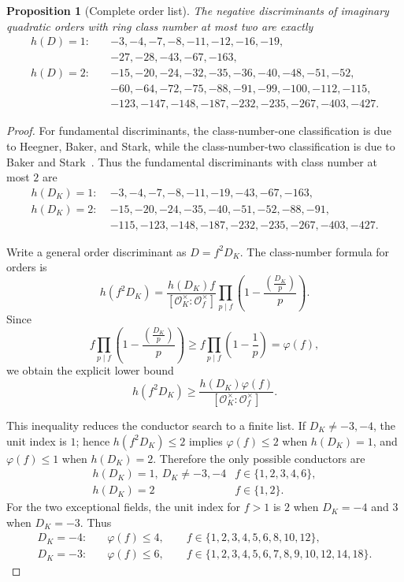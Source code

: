 \documentclass[11pt,a4paper]{amsart} %
\newtheorem{proposition}[theorem]{Proposition}
\theoremstyle{definition}
\begin{document}
\begin{proposition}[Complete order list]\label{prop:h2orders}
The negative discriminants of imaginary quadratic orders with ring class number
at most two are exactly
\[
\begin{aligned}
h(D)=1:\quad&
-3,-4,-7,-8,-11,-12,-16,-19,\\
&-27,-28,-43,-67,-163,\\
h(D)=2:\quad&
-15,-20,-24,-32,-35,-36,-40,-48,-51,-52,\\
&-60,-64,-72,-75,-88,-91,-99,-100,-112,-115,\\
&-123,-147,-148,-187,-232,-235,-267,-403,-427.
\end{aligned}
\]
\end{proposition}

\begin{proof}
For fundamental discriminants, the class-number-one classification is due to
Heegner, Baker, and Stark, while the class-number-two classification is due
to Baker and Stark~\cite{Stark1,Baker2,Stark2}. Thus the fundamental
discriminants with class number at most \(2\) are
\[
\begin{aligned}
h(D_K)=1:\;&
-3,-4,-7,-8,-11,-19,-43,-67,-163,\\
h(D_K)=2:\;&
-15,-20,-24,-35,-40,-51,-52,-88,-91,\\
&-115,-123,-148,-187,-232,-235,-267,-403,-427.
\end{aligned}
\]

Write a general order discriminant as \(D=f^2D_K\). The class-number formula
for orders is
\[
h(f^2D_K)=
\frac{h(D_K)f}{[\mathcal O_K^\times:\mathcal O_f^\times]}
\prod_{p\mid f}
\left(1-\frac{(\frac{D_K}{p})}{p}\right).
\tag{0}
\]
Since
\[
f\prod_{p\mid f}
\left(1-\frac{(\frac{D_K}{p})}{p}\right)
\ge
f\prod_{p\mid f}\left(1-\frac1p\right)
=\varphi(f),
\]
we obtain the explicit lower bound
\[
h(f^2D_K)\ge
\frac{h(D_K)\varphi(f)}
{[\mathcal O_K^\times:\mathcal O_f^\times]}.
\]

This inequality reduces the conductor search to a finite list. If
\(D_K\ne-3,-4\), the unit index is \(1\); hence \(h(f^2D_K)\le2\) implies
\(\varphi(f)\le2\) when \(h(D_K)=1\), and \(\varphi(f)\le1\) when
\(h(D_K)=2\). Therefore the only possible conductors are
\[
\begin{array}{c|c}
h(D_K)=1,\ D_K\ne-3,-4 & f\in\{1,2,3,4,6\},\\
h(D_K)=2 & f\in\{1,2\}.
\end{array}
\]
For the two exceptional fields, the unit index for \(f>1\) is \(2\) when
\(D_K=-4\) and \(3\) when \(D_K=-3\). Thus
\[
\begin{aligned}
D_K=-4:\quad&
\varphi(f)\le4,\qquad
f\in\{1,2,3,4,5,6,8,10,12\},\\
D_K=-3:\quad&
\varphi(f)\le6,\qquad
f\in\{1,2,3,4,5,6,7,8,9,10,12,14,18\}.
\end{aligned}
\]


\end{proof}
\end{document}
